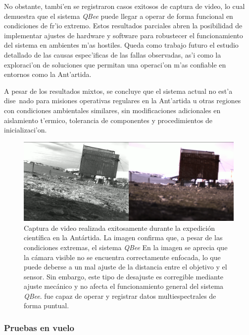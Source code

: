     \noindent No obstante, tambi'en se registraron casos exitosos de captura de video, lo cual demuestra que el sistema \textit{QBee} puede llegar a operar de forma funcional en condiciones de fr'io extremo. Estos resultados parciales abren la posibilidad de implementar ajustes de hardware y software para robustecer el funcionamiento del sistema en ambientes m'as hostiles. Queda como trabajo futuro el estudio detallado de las causas espec'ificas de las fallas observadas, as'i como la exploraci'on de soluciones que permitan una operaci'on m'as confiable en entornos como la Ant'artida.
    
    \noindent A pesar de los resultados mixtos, se concluye que el sistema actual no est'a dise~nado para misiones operativas regulares en la Ant'artida u otras regiones con condiciones ambientales similares, sin modificaciones adicionales en aislamiento t'ermico, tolerancia de componentes y procedimientos de inicializaci'on.
    
    \begin{figure}[h]
    \centering
    \includegraphics[width=1\textwidth]{Figures/C4/pinguinos.png}
    \caption{Captura de video realizada exitosamente durante la expedición científica en la Antártida. La imagen confirma que, a pesar de las condiciones extremas, el sistema \textit{QBee} En la imagen se aprecia que la cámara visible no se encuentra correctamente enfocada, lo que puede deberse a un mal ajuste de la distancia entre el objetivo y el sensor. Sin embargo, este tipo de desajuste es corregible mediante ajuste mecánico y no afecta el funcionamiento general del sistema \textit{QBee}. fue capaz de operar y registrar datos multiespectrales de forma puntual.}
    \label{fig:prueba_antartida}
    \end{figure}

    \subsubsection{Pruebas en vuelo}


